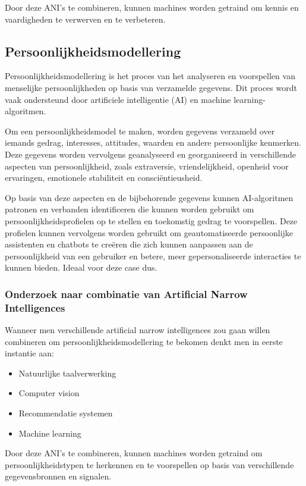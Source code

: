 Door deze ANI's te combineren, kunnen machines worden getraind om kennis en vaardigheden te verwerven en te verbeteren.

\subsection{Persoonlijkheidsmodellering}

Persoonlijkheidsmodellering is het proces van het analyseren en voorspellen van menselijke persoonlijkheden op basis van verzamelde gegevens. Dit proces wordt vaak ondersteund door artificiele intelligentie (AI) en machine learning-algoritmen.

Om een persoonlijkheidsmodel te maken, worden gegevens verzameld over iemands gedrag, interesses, attitudes, waarden en andere persoonlijke kenmerken. Deze gegevens worden vervolgens geanalyseerd en georganiseerd in verschillende aspecten van persoonlijkheid, zoals extraversie, vriendelijkheid, openheid voor ervaringen, emotionele stabiliteit en consciëntieusheid.

Op basis van deze aspecten en de bijbehorende gegevens kunnen AI-algoritmen patronen en verbanden identificeren die kunnen worden gebruikt om persoonlijkheidsprofielen op te stellen en toekomstig gedrag te voorspellen. Deze profielen kunnen vervolgens worden gebruikt om geautomatiseerde persoonlijke assistenten en chatbots te creëren die zich kunnen aanpassen aan de persoonlijkheid van een gebruiker en betere, meer gepersonaliseerde interacties te kunnen bieden. Ideaal voor deze case dus.

\subsubsection{Onderzoek naar combinatie van Artificial Narrow Intelligences}

Wanneer men verschillende artificial narrow intelligences zou gaan willen combineren om persoonlijkheidsmodellering te bekomen denkt men in eerste instantie aan:

\begin{itemize}
    \item Natuurlijke taalverwerking
    \item Computer vision
    \item Recommendatie systemen
    \item Machine learning
\end{itemize}

Door deze ANI's te combineren, kunnen machines worden getraind om persoonlijkheidstypen te herkennen en te voorspellen op basis van verschillende gegevensbronnen en signalen.

